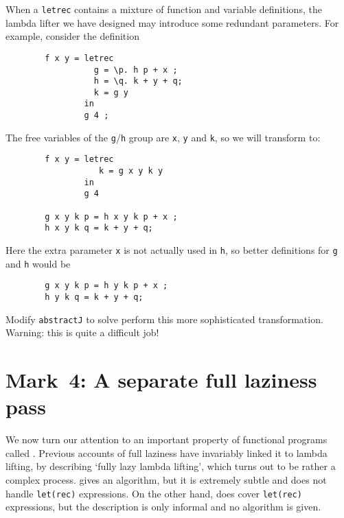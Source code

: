 When a \mbox{\tt letrec} contains a mixture of function and variable
definitions, the lambda lifter we have designed may introduce some
redundant parameters.  For example, consider the definition
\begin{verbatim}
        f x y = letrec
                  g = \p. h p + x ;
                  h = \q. k + y + q;
                  k = g y
                in
                g 4 ;
\end{verbatim}
The free variables of the \mbox{\tt g}/\mbox{\tt h} group are \mbox{\tt x}, \mbox{\tt y} and \mbox{\tt k}, so we
will transform to:
\begin{verbatim}
        f x y = letrec
                   k = g x y k y
                in
                g 4

        g x y k p = h x y k p + x ;
        h x y k q = k + y + q;
\end{verbatim}
Here the extra parameter \mbox{\tt x} is not actually used in \mbox{\tt h}, so better
definitions for \mbox{\tt g} and \mbox{\tt h} would be
\begin{verbatim}
        g x y k p = h y k p + x ;
        h y k q = k + y + q;
\end{verbatim}

\begin{exercise}\advanced
Modify \mbox{\tt abstractJ} to solve perform this more sophisticated transformation.
Warning: this is quite a difficult job!
\end{exercise}

        \section{Mark~4: A separate full laziness pass}
        \label{ll:mk2}

We now turn our attention to an important property of functional programs
called .
Previous accounts of full laziness have invariably linked it to lambda
lifting, by describing `fully lazy lambda lifting', which turns out
to be rather a complex process.  \cite{HughesThesis} gives an
algorithm, but it is extremely subtle and does not handle \mbox{\tt let(rec)}
expressions.  On the other hand, \cite{PJBook} does cover \mbox{\tt let(rec)}
expressions, but the description is only informal and no algorithm is
given.

